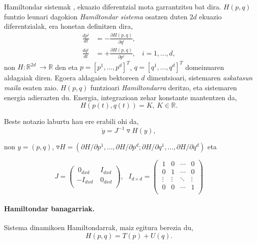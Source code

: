  
Hamiltondar sistemak \cite{SSerna2015}, ekuazio diferentzial mota garrantzitsu bat dira. $H(p,q)$ funtzio leunari dagokion \emph{Hamiltondar sistema} osatzen duten $2d$ ekuazio diferentzialak, era honetan definitzen dira,
\begin{align*}
\label{eq:212}
\frac{d {p}^i}{dt} & =-\frac{\partial H (p,q)}{\partial q^i} , \\
\frac{d {q}^i}{dt} & =+\frac{\partial H (p,q)}{\partial p^i} , \ \ \ \ i=1,\dots,d,
\end{align*}
non $H: {\mathbb{R}}^{2d} \ \longrightarrow {\mathbb{R}}$  den eta  $p=[p^1, \dots , p^d]^T$, $q=[q^1, \dots , q^d]^T$ domeinuaren aldagaiak diren. Egoera aldagaien bektoreen $d$ dimentsioari, sistemaren \emph{askatasun maila} esaten zaio. $H(p,q)$ funtzioari \emph{Hamiltondarra} deritzo, eta sistemaren energia adierazten du. Energia, integrazioan zehar konstante mantentzen da,
\begin{equation*}
\label{eq:212b}
H(p(t),q(t))=K, \ K \in \mathbb{R}.
\end{equation*}

Beste notazio laburtu hau ere erabili ohi da,
\begin{equation*}
 \label{eq:213}
\dot{y}=J^{-1}\triangledown H(y),
\end{equation*}

non $y=(p,q)$, $\triangledown H=(\partial H/\partial p^1,\dots,\partial H/\partial p^d; \partial H/\partial q^1,\dots,\partial H/\partial q^d)$ eta

\begin{equation*}
 J=\left(\begin{array}{cc}
   \ 0_{dxd} & \ I_{dxd} \\
    -I_{dxd} & \ 0_{dxd} \\
\end{array}\right), \ \ \ 
I_{d \times d}=\left(\begin{array}{cccc}
   \ 1       & 0      & \cdots & 0 \\
   \ 0       & 1      & \cdots & 0 \\
   \ \vdots  & \vdots & \ddots & \vdots \\
   \ 0       & 0 & \cdots & 1 \\
\end{array}\right)  
\end{equation*}


\paragraph*{Hamiltondar banagarriak.} Sistema dinamikoen Hamiltondarrak, maiz egitura berezia du,
\begin{equation*}
H({p},{q})=T(p)+U({q}).
\end{equation*} 

